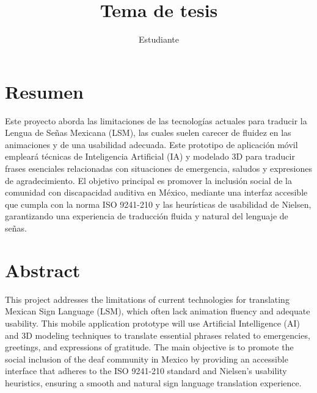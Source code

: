 \documentclass[12pt, letterpaper,oneside]{book}
\title{Tema de tesis}
\author{Estudiante}
\begin{document}
	\renewcommand{\listtablename}{{Índice de tablas}}
	\renewcommand{\tablename}{Tabla}
	

	
\section*{Resumen}
Este proyecto aborda las limitaciones de las tecnologías actuales para traducir la Lengua de Señas Mexicana (LSM), las cuales suelen carecer de fluidez en las animaciones y de una usabilidad adecuada. Este prototipo de aplicación móvil empleará técnicas de Inteligencia Artificial (IA) y modelado 3D para traducir frases esenciales relacionadas con situaciones de emergencia, saludos y expresiones de agradecimiento. El objetivo principal es promover la inclusión social de la comunidad con discapacidad auditiva en México, mediante una interfaz accesible que cumpla con la norma ISO 9241-210 y las heurísticas de usabilidad de Nielsen, garantizando una experiencia de traducción fluida y natural del lenguaje de señas.\\

\section*{Abstract}
This project addresses the limitations of current technologies for translating Mexican Sign Language (LSM), which often lack animation fluency and adequate usability. This mobile application prototype will use Artificial Intelligence (AI) and 3D modeling techniques to translate essential phrases related to emergencies, greetings, and expressions of gratitude. The main objective is to promote the social inclusion of the deaf community in Mexico by providing an accessible interface that adheres to the ISO 9241-210 standard and Nielsen's usability heuristics, ensuring a smooth and natural sign language translation experience.
\newpage\null\thispagestyle{empty}\newpage

\tableofcontents
\listoffigures     %
\listoftables      %





%
%
\end{document}
